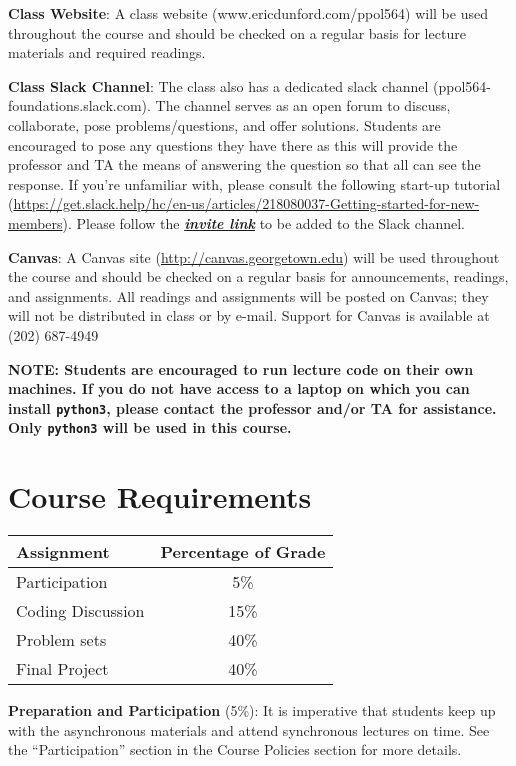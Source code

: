 \documentclass[
  12pt,
]{article}
\begin{document}
\textbf{Class Website}: A class website (www.ericdunford.com/ppol564)
will be used throughout the course and should be checked on a regular
basis for lecture materials and required readings.

\textbf{Class Slack Channel}: The class also has a dedicated slack
channel (ppol564-foundations.slack.com). The channel serves as an open
forum to discuss, collaborate, pose problems/questions, and offer
solutions. Students are encouraged to pose any questions they have there
as this will provide the professor and TA the means of answering the
question so that all can see the response. If you're unfamiliar with,
please consult the following start-up tutorial
(\url{https://get.slack.help/hc/en-us/articles/218080037-Getting-started-for-new-members}).
Please follow the
\href{https://join.slack.com/t/georgetown-jt44872/shared_invite/zt-gntolqrn-BiCH6ChQTKKODMyb5PdRAw}{\textbf{\emph{invite
link}}} to be added to the Slack channel.

\textbf{Canvas}: A Canvas site (\url{http://canvas.georgetown.edu}) will
be used throughout the course and should be checked on a regular basis
for announcements, readings, and assignments. All readings and
assignments will be posted on Canvas; they will not be distributed in
class or by e-mail. Support for Canvas is available at (202) 687-4949

\textbf{NOTE: Students are encouraged to run lecture code on their own
machines. If you do not have access to a laptop on which you can install
\texttt{python3}, please contact the professor and/or TA for assistance.
Only \texttt{python3} will be used in this course.}

\hypertarget{course-requirements}{%
\section{Course Requirements}\label{course-requirements}}

\begin{longtable}[]{@{}lc@{}}
\toprule
\textbf{Assignment} & \textbf{Percentage of Grade}\tabularnewline
\midrule
\endhead
Participation & 5\%\tabularnewline
Coding Discussion & 15\%\tabularnewline
Problem sets & 40\%\tabularnewline
Final Project & 40\%\tabularnewline
\bottomrule
\end{longtable}

\textbf{Preparation and Participation} (5\%): It is imperative that
students keep up with the asynchronous materials and attend synchronous
lectures on time. See the ``Participation'' section in the Course
Policies section for more details.
\end{document}

